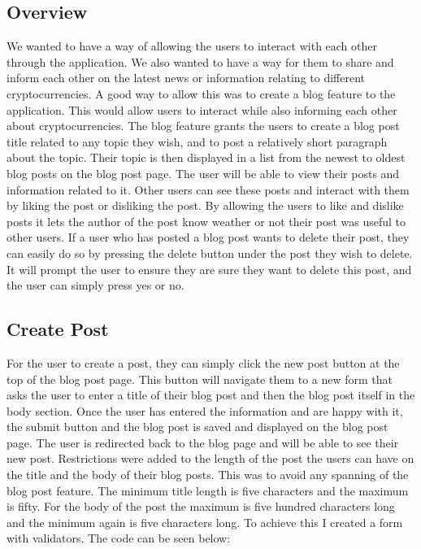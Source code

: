 \subsection{Overview}
We wanted to have a way of allowing the users to interact with each other through the application. We also wanted to have a way for them to share and inform each other on the latest news or information relating to different cryptocurrencies. A good way to allow this was to create a blog feature to the application. This would allow users to interact while also informing each other about cryptocurrencies. The blog feature grants the users to create a blog post title related to any topic they wish, and to post a relatively short paragraph about the topic. Their topic is then displayed in a list from the newest to oldest blog posts on the blog post page. The user will be able to view their posts and information related to it. Other users can see these posts and interact with them by liking the post or disliking the post. By allowing the users to like and dislike posts it lets the author of the post know weather or not their post was useful to other users. If a user who has posted a blog post wants to delete their post, they can easily do so by pressing the delete button under the post they wish to delete. It will prompt the user to ensure they are sure they want to delete this post, and the user can simply press yes or no.

\subsection{Create Post}
For the user to create a post, they can simply click the new post button at the top of the blog post page. This button will navigate them to a new form that asks the user to enter a title of their blog post and then the blog post itself in the body section. Once the user has entered the information and are happy with it, the submit button and the blog post is saved and displayed on the blog post page. The user is redirected back to the blog page and will be able to see their new post. Restrictions were added to the length of the post the users can have on the title and the body of their blog posts. This was to avoid any spanning of the blog post feature. The minimum title length is five characters and the maximum is fifty. For the body of the post the maximum is five hundred characters long and the minimum again is five characters long. To achieve this I created a form with validators. The code can be seen below:

